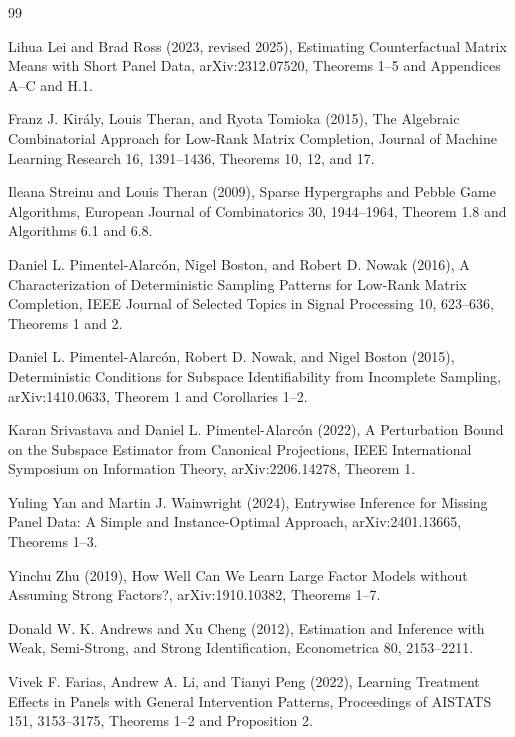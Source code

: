 \documentclass{article}
\begin{document}
\begin{thebibliography}{99}

   Lihua Lei and Brad Ross (2023, revised 2025), Estimating Counterfactual Matrix Means with Short Panel Data, arXiv:2312.07520, Theorems 1--5 and Appendices A--C and H.1.

   Franz J. Király, Louis Theran, and Ryota Tomioka (2015), The Algebraic Combinatorial Approach for Low-Rank Matrix Completion, Journal of Machine Learning Research 16, 1391--1436, Theorems 10, 12, and 17.

   Ileana Streinu and Louis Theran (2009), Sparse Hypergraphs and Pebble Game Algorithms, European Journal of Combinatorics 30, 1944--1964, Theorem 1.8 and Algorithms 6.1 and 6.8.

   Daniel L. Pimentel-Alarcón, Nigel Boston, and Robert D. Nowak (2016), A Characterization of Deterministic Sampling Patterns for Low-Rank Matrix Completion, IEEE Journal of Selected Topics in Signal Processing 10, 623--636, Theorems 1 and 2.

   Daniel L. Pimentel-Alarcón, Robert D. Nowak, and Nigel Boston (2015), Deterministic Conditions for Subspace Identifiability from Incomplete Sampling, arXiv:1410.0633, Theorem 1 and Corollaries 1--2.

   Karan Srivastava and Daniel L. Pimentel-Alarcón (2022), A Perturbation Bound on the Subspace Estimator from Canonical Projections, IEEE International Symposium on Information Theory, arXiv:2206.14278, Theorem 1.

   Yuling Yan and Martin J. Wainwright (2024), Entrywise Inference for Missing Panel Data: A Simple and Instance-Optimal Approach, arXiv:2401.13665, Theorems 1--3.

   Yinchu Zhu (2019), How Well Can We Learn Large Factor Models without Assuming Strong Factors?, arXiv:1910.10382, Theorems 1--7.

   Donald W. K. Andrews and Xu Cheng (2012), Estimation and Inference with Weak, Semi-Strong, and Strong Identification, Econometrica 80, 2153--2211.

   Vivek F. Farias, Andrew A. Li, and Tianyi Peng (2022), Learning Treatment Effects in Panels with General Intervention Patterns, Proceedings of AISTATS 151, 3153--3175, Theorems 1--2 and Proposition 2.


\end{thebibliography}
\end{document}
